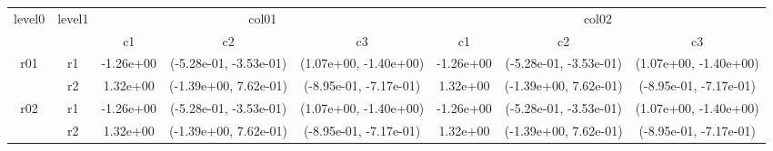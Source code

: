 \begin{tabular}{cccccccc}
\toprule
\multirow{2}{*}{level0} & \multirow{2}{*}{level1}&\multicolumn{3}{c}{col01}&\multicolumn{3}{c}{col02}\tabularnewline
\cmidrule(lr){3-5}
\cmidrule(lr){6-8}
&&c1&c2&c3&c1&c2&c3\tabularnewline
\midrule
\midrule
\multirow{2}{*}{r01}&r1&-1.26e+00& (-5.28e-01, -3.53e-01)& (1.07e+00, -1.40e+00)&-1.26e+00& (-5.28e-01, -3.53e-01)& (1.07e+00, -1.40e+00)\tabularnewline
&r2&1.32e+00& (-1.39e+00, 7.62e-01)& (-8.95e-01, -7.17e-01)&1.32e+00& (-1.39e+00, 7.62e-01)& (-8.95e-01, -7.17e-01)\tabularnewline
\midrule
\multirow{2}{*}{r02}&r1&-1.26e+00& (-5.28e-01, -3.53e-01)& (1.07e+00, -1.40e+00)&-1.26e+00& (-5.28e-01, -3.53e-01)& (1.07e+00, -1.40e+00)\tabularnewline
&r2&1.32e+00& (-1.39e+00, 7.62e-01)& (-8.95e-01, -7.17e-01)&1.32e+00& (-1.39e+00, 7.62e-01)& (-8.95e-01, -7.17e-01)\tabularnewline
\bottomrule
\end{tabular}
